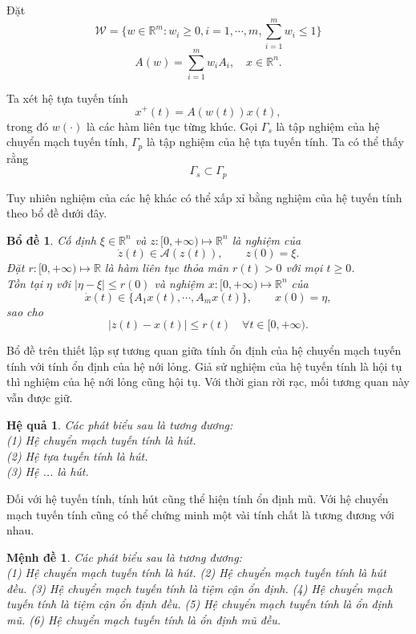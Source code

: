 \documentclass[14pt,a4paper,oneside]{report}		%
\newtheorem{lemma}[theorem]{Bổ đề}
\newtheorem{corollary}[theorem]{Hệ quả}
\newtheorem{proposition}[theorem]{Mệnh đề}
\begin{document}
Đặt
$$\mathcal{W} = \{ w\in\mathbb{R}^m:w_i \geq 0,  i=1,\cdots ,m,\sum_{i=1}^m w_i \leq 1 \}$$
\begin{equation} \label{2-20}
A(w) = \sum_{i=1}^m w_iA_i,\quad x\in\mathbb{R}^n.
\end{equation}

Ta xét hệ tựa tuyến tính
\begin{equation} \label{eq2-23}
x^+(t)=A(w(t))x(t),
\end{equation}
trong đó $w(\cdot)$ là các hàm liên tục từng khúc. Gọi $\Gamma_s$ là tập nghiệm của hệ chuyển mạch tuyến tính, $\Gamma_p$ là tập nghiệm của hệ tựa tuyến tính. Ta có thể thấy rằng 
$$\Gamma_s\subset\Gamma_p$$

Tuy nhiên nghiệm của các hệ khác có thể xấp xỉ bằng nghiệm của hệ tuyến tính theo bổ đề dưới đây.

\begin{lemma} \label{le1}
Cố định $\xi\in\mathbb{R}^n$ và $z:[0,+\infty)\mapsto\mathbb{R}^n$ là nghiệm của
$$\dot{z}(t)\in\mathcal{A}(z(t)), \qquad z(0)=\xi.$$
Đặt $r:[0,+\infty)\mapsto\mathbb{R}$ là hàm liên tục thỏa mãn $r(t)>0$ với mọi $t\geq 0$.\\
Tồn tại $\eta$ với $|\eta - \xi|\leq r(0)$ và nghiệm $x:[0,+\infty)\mapsto\mathbb{R}^n$ của
$$\dot{x}(t)\in\{A_1x(t),\cdots,A_mx(t)\},\qquad x(0)=\eta,$$
sao cho
$$|z(t)-x(t)|\leq r(t)\quad\forall t\in[0,+\infty).$$
\end{lemma}

Bổ đề trên thiết lập sự tương quan giữa tính ổn định của hệ chuyển mạch tuyến tính với tính ổn định của hệ nới lỏng. Giả sử nghiệm của hệ tuyến tính là hội tụ thì nghiệm của hệ nới lỏng cũng hội tụ. Với thời gian rời rạc, mối tương quan này vẫn được giữ.

\begin{corollary} \label{co2-12}
Các phát biểu sau là tương đương:\\
(1) Hệ chuyển mạch tuyến tính là hút.\\
(2) Hệ tựa tuyến tính là hút.\\
(3) Hệ ... là hút.
\end{corollary}

Đối với hệ tuyến tính, tính hút cũng thể hiện tính ổn định mũ. Với hệ chuyển mạch tuyến tính cũng có thể chứng minh một vài tính chất là tương đương với nhau.

\begin{proposition} \label{pro2-13}
Các phát biểu sau là tương đương:\\
(1) Hệ chuyển mạch tuyến tính là hút.
(2) Hệ chuyển mạch tuyến tính là hút đều.
(3) Hệ chuyển mạch tuyến tính là tiệm cận ổn định.
(4) Hệ chuyển mạch tuyến tính là tiệm cận ổn định đều.
(5) Hệ chuyển mạch tuyến tính là ổn định mũ.
(6) Hệ chuyển mạch tuyến tính là ổn định mũ đều.
\end{proposition}
\end{document}
